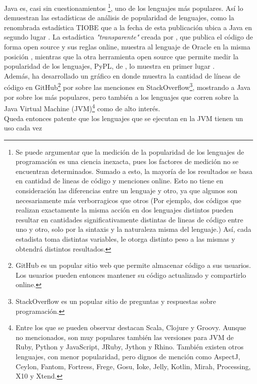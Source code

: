 Java es, casi sin cuestionamientos \footnote{
	Se puede argumentar que la medición de la popularidad de
	los lenguajes de programación es una ciencia inexacta, pues los factores de medición no
	se encuentran determinados. Sumado a esto, la mayoría de los resultados se basa en
	cantidad de lineas de código y menciones online. Esto no tiene en consideración las
	diferencias entre un lenguaje y otro, ya que algunos son necesariamente más
	verborragicos que otros (Por ejemplo, dos códigos que realizan exactamente la misma
	acción en dos lenguajes distintos pueden resultar en cantidades significativamente
	distintas de lineas de código entre uno y otro, solo por la sintaxis y la naturaleza
	misma del lenguaje.) Así, cada estadista toma distintas variables, le otorga distinto
	peso a las mismas y obtendrá distintos resultados.
}, uno de los lenguajes más populares. Así lo demuestran las estadísticas de análisis de
popularidad de lenguajes, como la renombrada estadística TIOBE que a la fecha de esta
publicación ubica a Java en segundo lugar . La estadística
\emph{"transparente"} creada por , que publica el
código de forma open source y sus reglas online, muestra al lenguaje de Oracle en la misma
posición , mientras que la otra herramienta open source que
permite medir la popularidad de los lenguajes, PyPL, de
, lo muestra en primer lugar
.\\
Además,  ha desarrollado un gráfico en donde muestra la
cantidad de líneas de código en GitHub\footnote{
	GitHub es un popular sitio web que permite almacenar código a sus usuarios. Los usuarios
	pueden entonces mantener su código actualizado y compartirlo online.
} por sobre las menciones en StackOverflow\footnote{
StackOverflow es un popular sitio de preguntas y respuestas sobre programación.
}, mostrando a Java por sobre los más populares, pero también a los lenguajes que corren
sobre la Java Virtual Machine (JVM)\footnote{
	Entre los que se pueden observar destacan Scala, Clojure y Groovy. Aunque no
	mencionados, son muy populares también las versiones para JVM de Ruby, Python y
	JavaScript, JRuby, Jython y Rhino. También existen otros lenguajes, con menor
	popularidad, pero dignos de mención como AspectJ, Ceylon, Fantom, Fortress, Frege, Gosu,
	Ioke, Jelly, Kotlin, Mirah, Processing, X10 y Xtend.
} como de alto interés.\\
Queda entonces patente que los lenguajes que se ejecutan en la JVM tienen un uso cada vez
